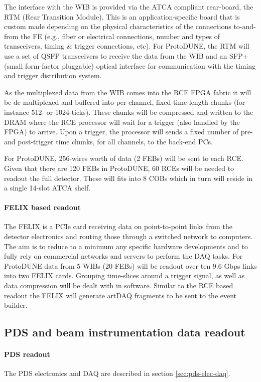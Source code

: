 The interface with the WIB is provided via the ATCA compliant rear-board, the RTM (Rear Transition Module).  
This is an application-specific board
that is custom made depending on the physical characteristics of the
connections to-and-from the FE (e.g., fiber or electrical connections,
number and types of transceivers, timing \& trigger connections, etc).
For ProtoDUNE, the RTM will use a set of QSFP transceivers to receive
the data from the WIB and an SFP+ (small form-factor pluggable)
 optical interface for communication
with the timing and trigger distribution system.

As the multiplexed data from the WIB comes into the RCE FPGA fabric
it will be de-multiplexed and buffered into per-channel, fixed-time
length chunks (for instance 512- or 1024-ticks).  These chunks will be
compressed and written to the DRAM where the RCE processor will wait
for a trigger (also handled by the FPGA) to arrive.  Upon a trigger, the
processor will sends a fixed number of pre- and post-trigger time chunks,
for all channels, to the back-end PCs.  

For ProtoDUNE, 256-wires worth of data (2 FEBs) will be sent to each RCE.
Given that there are 120 FEBs in ProtoDUNE, 60 RCEs will be needed to
readout the full detector.  These will fits into 8 COBs which in turn
will reside in a single 14-slot ATCA shelf.

\paragraph{FELIX based readout}
The FELIX is a PCIe card receiving data on point-to-point links from
the detector electronics and routing those through a switched network
to computers.  The aim is to reduce to a minimum any specific hardware
developments and to fully rely on commercial networks and servers to
perform the DAQ tasks.  For ProtoDUNE data from 5 WIBs (20 FEBs) will
be readout over ten 9.6 Gbps links into two FELIX cards.  Grouping
time-slices around a trigger signal, as well as data compression will be
dealt with in software. Similar to the RCE based readout the FELIX will
generate artDAQ fragments to be sent to the event builder.


\subsection{PDS and beam instrumentation data readout}

\paragraph{PDS readout} 
The PDS electronics and DAQ are described in section \ref{sec:pds-elec-daq}.

